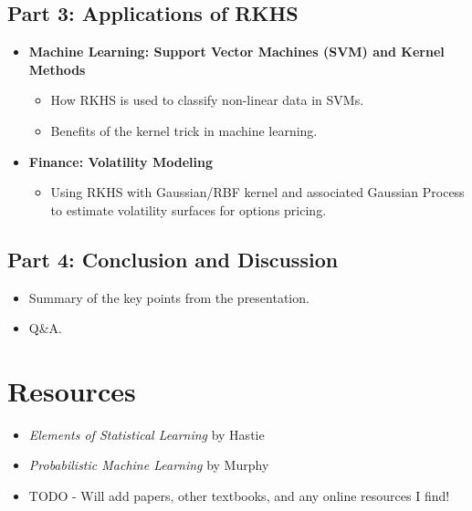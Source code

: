 \documentclass[a4paper]{article}
\begin{document}
\subsection*{Part 3: Applications of RKHS}
\begin{itemize}
    \item \textbf{Machine Learning: Support Vector Machines (SVM) and Kernel Methods}
    \begin{itemize}
        \item How RKHS is used to classify non-linear data in SVMs.
        \item Benefits of the kernel trick in machine learning.
    \end{itemize}
  \item \textbf{Finance: Volatility Modeling}
    \begin{itemize}
        \item Using RKHS with Gaussian/RBF kernel and associated Gaussian Process to estimate volatility surfaces for options pricing.
    \end{itemize}
\end{itemize}

\subsection*{Part 4: Conclusion and Discussion}
\begin{itemize}
    \item Summary of the key points from the presentation.
    \item Q\&A.
\end{itemize}
 
\section{Resources}
\begin{itemize}
  \item \textit{Elements of Statistical Learning} by Hastie
  \item \textit{Probabilistic Machine Learning} by Murphy
  \item TODO - Will add papers, other textbooks, and any online resources I find!
\end{itemize}
\end{document}
